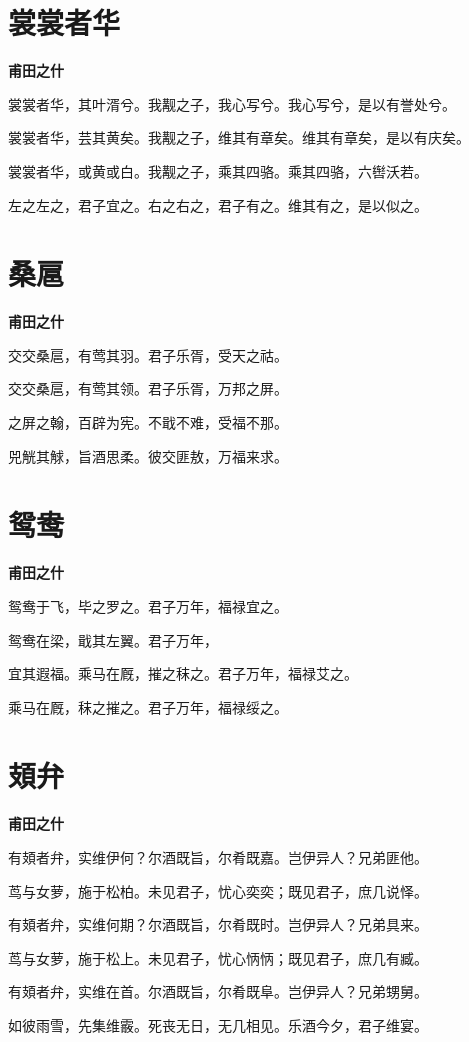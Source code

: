 \documentclass[12pt,a4paper]{ctexbook}
\begin{document}
\section{裳裳者华}
\textbf{甫田之什}\par\vspace{0.5em}
裳裳者华，其叶湑兮。我觏之子，我心写兮。我心写兮，是以有誉处兮。\par
裳裳者华，芸其黄矣。我觏之子，维其有章矣。维其有章矣，是以有庆矣。\par
裳裳者华，或黄或白。我觏之子，乘其四骆。乘其四骆，六辔沃若。\par
左之左之，君子宜之。右之右之，君子有之。维其有之，是以似之。\par

\section{桑扈}
\textbf{甫田之什}\par\vspace{0.5em}
交交桑扈，有莺其羽。君子乐胥，受天之祜。\par
交交桑扈，有莺其领。君子乐胥，万邦之屏。\par
之屏之翰，百辟为宪。不戢不难，受福不那。\par
兕觥其觩，旨酒思柔。彼交匪敖，万福来求。\par

\section{鸳鸯}
\textbf{甫田之什}\par\vspace{0.5em}
鸳鸯于飞，毕之罗之。君子万年，福禄宜之。\par
鸳鸯在梁，戢其左翼。君子万年，\par
宜其遐福。乘马在厩，摧之秣之。君子万年，福禄艾之。\par
乘马在厩，秣之摧之。君子万年，福禄绥之。\par

\section{頍弁}
\textbf{甫田之什}\par\vspace{0.5em}
有頍者弁，实维伊何？尔酒既旨，尔肴既嘉。岂伊异人？兄弟匪他。\par
茑与女萝，施于松柏。未见君子，忧心奕奕；既见君子，庶几说怿。\par
有頍者弁，实维何期？尔酒既旨，尔肴既时。岂伊异人？兄弟具来。\par
茑与女萝，施于松上。未见君子，忧心怲怲；既见君子，庶几有臧。\par
有頍者弁，实维在首。尔酒既旨，尔肴既阜。岂伊异人？兄弟甥舅。\par
如彼雨雪，先集维霰。死丧无日，无几相见。乐酒今夕，君子维宴。\par
\end{document}
